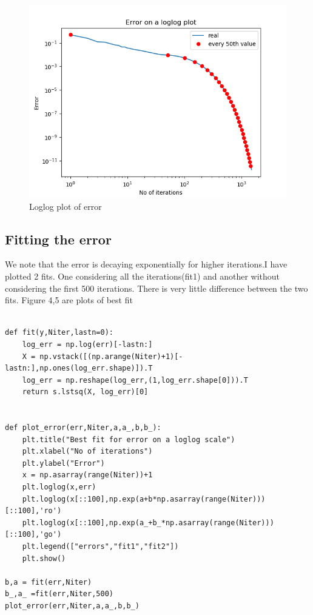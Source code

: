 \documentclass{article}
\begin{document}
\begin{figure}[h!]
\centering
\includegraphics[scale=0.6]{Figure_3_5.png}
\caption{Loglog plot of error}
\label{Loglog plot of error}
\end{figure}



\subsection*{Fitting the error}
We note that the error is decaying exponentially for higher iterations.I have plotted 2 fits. One considering all the iterations(fit1) and another without considering the first 500 iterations. There is very little difference between the two fits. Figure 4,5 are plots of best fit
\begin{lstlisting}

def fit(y,Niter,lastn=0):
    log_err = np.log(err)[-lastn:]
    X = np.vstack([(np.arange(Niter)+1)[-lastn:],np.ones(log_err.shape)]).T
    log_err = np.reshape(log_err,(1,log_err.shape[0])).T
    return s.lstsq(X, log_err)[0]


def plot_error(err,Niter,a,a_,b,b_):
    plt.title("Best fit for error on a loglog scale")
    plt.xlabel("No of iterations")
    plt.ylabel("Error")
    x = np.asarray(range(Niter))+1
    plt.loglog(x,err)
    plt.loglog(x[::100],np.exp(a+b*np.asarray(range(Niter)))[::100],'ro')
    plt.loglog(x[::100],np.exp(a_+b_*np.asarray(range(Niter)))[::100],'go')
    plt.legend(["errors","fit1","fit2"])
    plt.show()

b,a = fit(err,Niter)
b_,a_ =fit(err,Niter,500)
plot_error(err,Niter,a,a_,b,b_)
\end{lstlisting}
\end{document}
